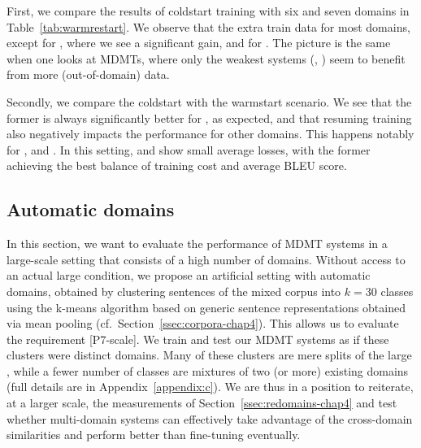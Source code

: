 First, we compare the results of coldstart training with six and seven domains in Table~\ref{tab:warmrestart}. We observe that the extra train data  for most domains, except for , where we see a significant gain, and for . The picture is the same when one looks at MDMTs, where only the weakest systems (, ) seem to benefit from more (out-of-domain) data.

Secondly, we compare the coldstart with the warmstart scenario. We see that the former is always significantly better for , as expected, and that resuming training also negatively impacts the performance for other domains. This happens notably for ,  and . In this setting,  and  show small average losses, with the former achieving the best balance of training cost and average BLEU score.

\subsection{Automatic domains \label{ssec:autodomains-chap4}}
In this section, we want to evaluate the performance of MDMT systems in a large-scale setting that consists of a high number of domains. Without access to an actual large condition, we propose an artificial setting with automatic domains, obtained by clustering sentences of the mixed corpus into $k=30$ classes using the k-means algorithm based on generic sentence representations obtained via mean pooling (cf.\ Section~\ref{ssec:corpora-chap4}). This allows us to evaluate the requirement [P7-scale]. We train and test our MDMT systems as if these clusters were distinct domains. Many of these clusters are mere splits of the large , while a fewer number of classes are mixtures of two (or more) existing domains (full details are in Appendix~\ref{appendix:c}). We are thus in a position to reiterate, at a larger scale, the measurements of Section~\ref{ssec:redomains-chap4} and test whether multi-domain systems can effectively take advantage of the cross-domain similarities and perform better than fine-tuning eventually. 

